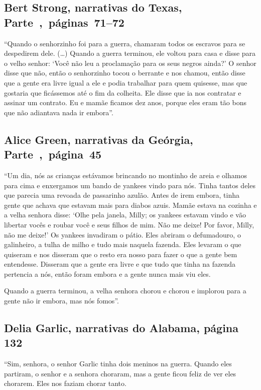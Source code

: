 \subsection{Bert Strong, narrativas do Texas, Parte~,~páginas~71--72}
\label{ref259}

``Quando o senhorzinho foi para a guerra, chamaram todos os escravos
para se despedirem dele. (\ldots{}) Quando a guerra terminou, ele voltou
para casa e disse para o velho senhor: `Você não leu a proclamação para
os seus negros ainda?' O senhor disse que não, então o senhorzinho tocou
o berrante e nos chamou, então disse que a gente era livre igual a ele e
podia trabalhar para quem quisesse, mas que gostaria que ficássemos até
o fim da colheita. Ele disse que ia nos contratar e assinar um contrato.
Eu e mamãe ficamos dez anos, porque eles eram tão bons que não adiantava
nada ir embora''.

\subsection{Alice Green, narrativas da Geórgia, Parte~,~página~45}
\label{ref110}

``Um dia, nós as crianças estávamos brincando no montinho de areia e
olhamos para cima e enxergamos um bando de yankees vindo para nós. Tinha
tantos deles que parecia uma revoada de passarinho azulão. Antes de irem
embora, tinha gente que achava que estavam mais para diabos azuis. Mamãe
estava na cozinha e a velha senhora disse: `Olhe pela janela, Milly; os
yankees estavam vindo e vão libertar vocês e roubar você e seus filhos
de mim. Não me deixe! Por favor, Milly, não me deixe!' Os yankees
invadiram o pátio. Eles abriram o defumadouro, o galinheiro, a tulha de
milho e tudo mais naquela fazenda. Eles levaram o que quiseram e nos
disseram que o resto era nosso para fazer o que a gente bem entendesse.
Disseram que a gente era livre e que tudo que tinha na fazenda pertencia
a nós, então foram embora e a gente nunca mais viu eles.

Quando a guerra terminou, a velha senhora chorou e chorou e implorou
para a gente não ir embora, mas nós fomos''.

\subsection{Delia Garlic, narrativas do Alabama, página 132} \label{ref101}

``Sim, senhora, o senhor Garlic tinha dois meninos na guerra. Quando
eles partiram, o senhor e a senhora choraram, mas a gente ficou feliz de
ver eles chorarem. Eles nos faziam chorar tanto.

